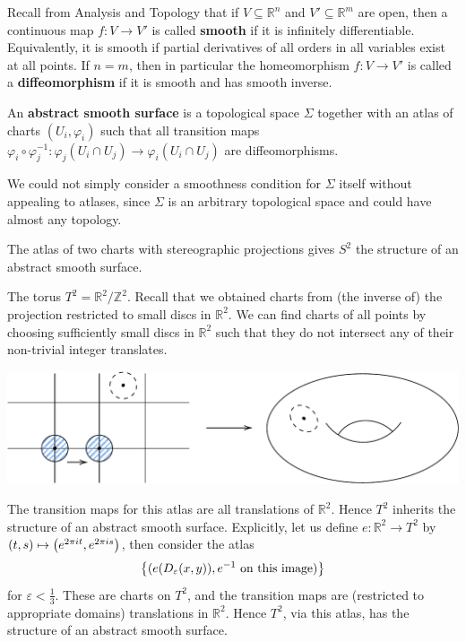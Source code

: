 \documentclass[a4paper]{article}
\begin{document}
Recall from Analysis and Topology that if \( V \subseteq \mathbb R^n \) and \( V' \subseteq \mathbb R^m \) are open, then a continuous map \( f \colon V \to V' \) is called \textbf{smooth} if it is infinitely differentiable.
Equivalently, it is smooth if partial derivatives of all orders in all variables exist at all points.
If \( n = m \), then in particular the homeomorphism \( f \colon V \to V' \) is called a \textbf{diffeomorphism} if it is smooth and has smooth inverse.

\begin{definition}
	An \textbf{abstract smooth surface} is a topological space \( \Sigma \) together with an atlas of charts \( (U_i, \varphi_i) \) such that all transition maps \( \varphi_i \circ \varphi_j^{-1} \colon \varphi_j(U_i \cap U_j) \to \varphi_i(U_i \cap U_j) \) are diffeomorphisms.
\end{definition}

\begin{remark}
	We could not simply consider a smoothness condition for \( \Sigma \) itself without appealing to atlases, since \( \Sigma \) is an arbitrary topological space and could have almost any topology.
\end{remark}

\begin{example}
	The atlas of two charts with stereographic projections gives \( S^2 \) the structure of an abstract smooth surface.
\end{example}

\begin{example}
	The torus \( T^2 = {\mathbb R^2}/{\mathbb Z^2} \). Recall that we obtained charts from (the inverse of) the projection restricted to small discs in $ \mathbb{R}^{2} $. We can find charts of all points by choosing sufficiently small discs in \( \mathbb R^2 \) such that they do not intersect any of their non-trivial integer translates.

	\begin{center}
	\includegraphics[scale=0.65]{TorusChart1}
	\end{center}

	The transition maps for this atlas are all translations of \( \mathbb R^2 \).
	Hence \( T^2 \) inherits the structure of an abstract smooth surface.
	Explicitly, let us define \( e \colon \mathbb R^2 \to T^2 \) by \( (t,s) \mapsto \qty(e^{2\pi i t}, e^{2 \pi i s}) \), then consider the atlas
	\[
		\qty{(e\qty(D_\varepsilon(x,y)), e^{-1} \text{ on this image})}
	\]
	for \( \varepsilon < \frac{1}{3} \).
	These are charts on \( T^2 \), and the transition maps are (restricted to appropriate domains) translations in \( \mathbb R^2 \).
	Hence \( T^2 \), via this atlas, has the structure of an abstract smooth surface.
\end{example}
\end{document}

